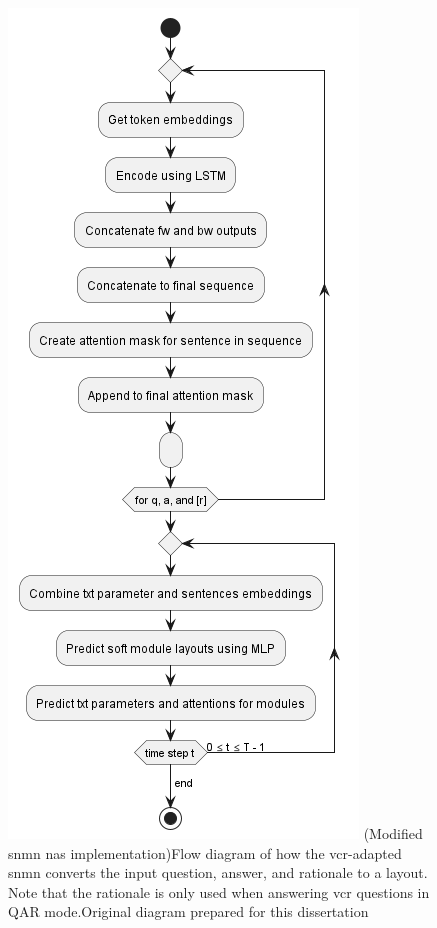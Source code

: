 \begin{figure}[htbp]
    \centering
    \includegraphics[width=.55\textwidth,keepaspectratio]{content/chapters/methodology/model_adaptation/figures/controller-layout-vcr-snmn.png}
    \captionsource(Modified \gls{snmn} \gls{nas} implementation){Flow diagram of how the \gls{vcr}-adapted \gls{snmn} converts the input question, answer, and rationale to a layout. Note that the rationale is only used when answering \gls{vcr} questions in QAR mode.\label{fig:vcr_snmn_input_unit}}{Original diagram prepared for this dissertation}
\end{figure}


